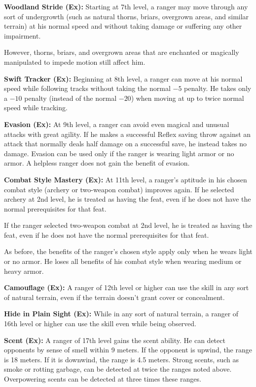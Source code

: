 \textbf{Woodland Stride (Ex):} Starting at 7th level, a ranger may move through any sort of undergrowth (such as natural thorns, briars, overgrown areas, and similar terrain) at his normal speed and without taking damage or suffering any other impairment.

However, thorns, briars, and overgrown areas that are enchanted or magically manipulated to impede motion still affect him.


\textbf{Swift Tracker (Ex):} Beginning at 8th level, a ranger can move at his normal speed while following tracks without taking the normal $-5$ penalty. He takes only a $-10$ penalty (instead of the normal $-20$) when moving at up to twice normal speed while tracking.


\textbf{Evasion (Ex):} At 9th level, a ranger can avoid even magical and unusual attacks with great agility. If he makes a successful Reflex saving throw against an attack that normally deals half damage on a successful save, he instead takes no damage. Evasion can be used only if the ranger is wearing light armor or no armor. A helpless ranger does not gain the benefit of evasion.


\textbf{Combat Style Mastery (Ex):} At 11th level, a ranger's aptitude in his chosen combat style (archery or two-weapon combat) improves again. If he selected archery at 2nd level, he is treated as having the  feat, even if he does not have the normal prerequisites for that feat.

If the ranger selected two-weapon combat at 2nd level, he is treated as having the  feat, even if he does not have the normal prerequisites for that feat.

As before, the benefits of the ranger's chosen style apply only when he wears light or no armor. He loses all benefits of his combat style when wearing medium or heavy armor.


\textbf{Camouflage (Ex):} A ranger of 12th level or higher can use the  skill in any sort of natural terrain, even if the terrain doesn't grant cover or concealment.


\textbf{Hide in Plain Sight (Ex):} While in any sort of natural terrain, a ranger of 16th level or higher can use the  skill even while being observed.


\textbf{Scent (Ex):} A ranger of 17th level gains the scent ability. He can detect opponents by sense of smell within 9 meters. If the opponent is upwind, the range is 18 meters. If it is downwind, the range is 4.5 meters. Strong scents, such as smoke or rotting garbage, can be detected at twice the ranges noted above. Overpowering scents can be detected at three times these ranges.

